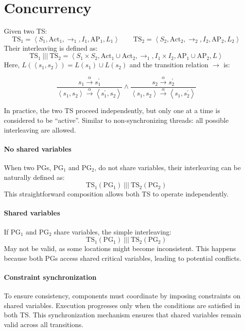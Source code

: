 \section{Concurrency}

Given two TS: 
\[\text{TS}_1=\left\langle S_1, \text{Act}_1, \rightarrow_1, I_1,\text{AP}_1, L_1\right\rangle \qquad \text{TS}_2=\left\langle S_2, \text{Act}_2, \rightarrow_2, I_2,\text{AP}_2, L_2\right\rangle\]    
Their interleaving is defined as: 
\[\text{TS}_1\:|||\:\text{TS}_2=\left\langle S_1\times S_2, \text{Act}_1 \cup \text{Act}_2, \rightarrow_1, I_1\times I_2,\text{AP}_1\cup \text{AP}_2, L\right\rangle\]
Here,  $L(\left\langle s_1,s_2\right\rangle )= L(s_1) \cup L(s_2)$ and the transition relation $\rightarrow$ is:

\[\dfrac{s_1\xrightarrow{\alpha}s_1^\prime}{\left\langle s_1,s_2\right\rangle \xrightarrow{\alpha}\left\langle s_1^\prime,s_2\right\rangle} \land \dfrac{s_2\xrightarrow{\alpha}s_2^\prime}{\left\langle s_1,s_2\right\rangle \xrightarrow{\alpha}\left\langle s_1,s_2^\prime\right\rangle}\]

\noindent In practice, the two TS proceed independently, but only one at a time is considered to be “active”. 
Similar to non-synchronizing threads: all possible interleaving are allowed.

\paragraph*{No shared variables}
When two PGs, $\text{PG}_1$ and $\text{PG}_2$, do not share variables, their interleaving can be naturally defined as:
\[\text{TS}_1(\text{PG}_1)\:|||\: \text{TS}_2(\text{PG}_2)\] 
This straightforward composition allows both TS to operate independently.

\paragraph*{Shared variables} 
If $\text{PG}_1$ and $\text{PG}_2$ share variables, the simple interleaving:
\[\text{TS}_1(\text{PG}_1)\:|||\:\text{TS}_2(\text{PG}_2)\] 
May not be valid, as some locations might become inconsistent. 
This happens because both PGs access shared critical variables, leading to potential conflicts.

\paragraph*{Constraint synchronization}
To ensure consistency, components must coordinate by imposing constraints on shared variables.
Execution progresses only when the conditions are satisfied in both TS. 
This synchronization mechanism ensures that shared variables remain valid across all transitions.

